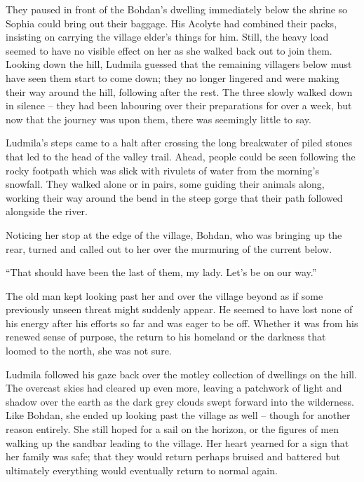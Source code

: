  

They paused in front of the Bohdan’s dwelling immediately below the shrine so Sophia could bring out their baggage. His Acolyte had combined their packs, insisting on carrying the village elder’s things for him. Still, the heavy load seemed to have no visible effect on her as she walked back out to join them. Looking down the hill, Ludmila guessed that the remaining villagers below must have seen them start to come down; they no longer lingered and were making their way around the hill, following after the rest. The three slowly walked down in silence – they had been labouring over their preparations for over a week, but now that the journey was upon them, there was seemingly little to say.

 

Ludmila’s steps came to a halt after crossing the long breakwater of piled stones that led to the head of the valley trail. Ahead, people could be seen following the rocky footpath which was slick with rivulets of water from the morning’s snowfall. They walked alone or in pairs, some guiding their animals along, working their way around the bend in the steep gorge that their path followed alongside the river.

 

Noticing her stop at the edge of the village, Bohdan, who was bringing up the rear, turned and called out to her over the murmuring of the current below.

 

“That should have been the last of them, my lady. Let’s be on our way.”

 

The old man kept looking past her and over the village beyond as if some previously unseen threat might suddenly appear. He seemed to have lost none of his energy after his efforts so far and was eager to be off. Whether it was from his renewed sense of purpose, the return to his homeland or the darkness that loomed to the north, she was not sure.

 

Ludmila followed his gaze back over the motley collection of dwellings on the hill. The overcast skies had cleared up even more, leaving a patchwork of light and shadow over the earth as the dark grey clouds swept forward into the wilderness. Like Bohdan, she ended up looking past the village as well – though for another reason entirely. She still hoped for a sail on the horizon, or the figures of men walking up the sandbar leading to the village. Her heart yearned for a sign that her family was safe; that they would return perhaps bruised and battered but ultimately everything would eventually return to normal again.

